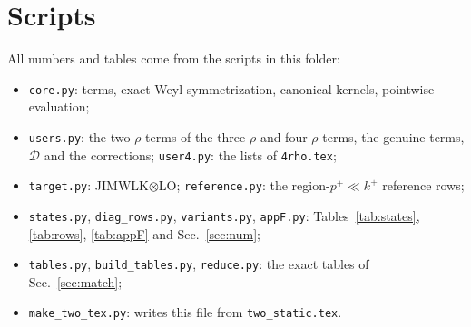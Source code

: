 \documentclass[10pt]{article}
\numberwithin{equation}{section}
\begin{document}
\section{Scripts}\label{app:scripts}
All numbers and tables come from the scripts in this folder:
\begin{itemize}
\item \texttt{core.py}: terms, exact Weyl symmetrization, canonical kernels, pointwise evaluation;
\item \texttt{users.py}: the two-$\rho$ terms of the three-$\rho$ and four-$\rho$ terms, the genuine terms, $\mathcal D$ and the corrections; \texttt{user4.py}: the lists of \texttt{4rho.tex};
\item \texttt{target.py}: JIMWLK$\otimes$LO; \texttt{reference.py}: the region-$p^+\ll k^+$ reference rows;
\item \texttt{states.py}, \texttt{diag\_rows.py}, \texttt{variants.py}, \texttt{appF.py}: Tables~\ref{tab:states}, \ref{tab:rows}, \ref{tab:appF} and Sec.~\ref{sec:num};
\item \texttt{tables.py}, \texttt{build\_tables.py}, \texttt{reduce.py}: the exact tables of Sec.~\ref{sec:match};
\item \texttt{make\_two\_tex.py}: writes this file from \texttt{two\_static.tex}.
\end{itemize}
\end{document}
